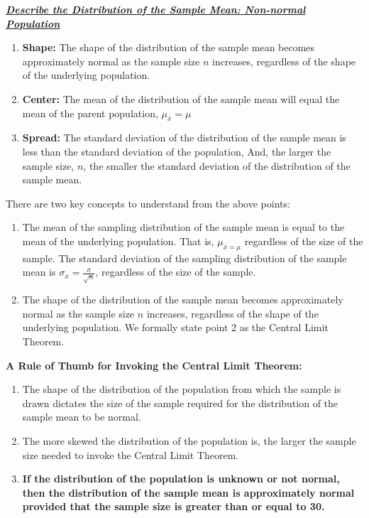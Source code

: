 \documentclass{report}
\begin{document}
     \pagebreak \bigbreak \noindent 
     \textbf{\textit{\underline{Describe the Distribution of the Sample Mean: Non-normal Population}}}
     \bigbreak \noindent 
     \begin{enumerate}
         \item \textbf{Shape:} The shape of the distribution of the sample mean becomes approximately normal as the sample size $n $ increases, regardless of the shape of the underlying population.
        \item \textbf{Center:} The mean of the distribution of the sample mean will equal the mean of the parent population, $\mu_{\overline{x}} = \mu$
        \item \textbf{Spread:} The standard deviation of the distribution of the sample mean is less than the standard deviation of the population, And, the larger the sample size, $n $, the smaller the standard deviation of the distribution of the sample mean.
     \end{enumerate}
     \bigbreak \noindent 
     There are two key concepts to understand from the above points:
     \begin{enumerate}
         \item The mean of the sampling distribution of the sample mean is equal to the mean of the underlying population. That is, $\mu_{\overline{x} = \mu} $ regardless of the size of the sample. The standard deviation of the sampling distribution of the sample mean is $\sigma_{\overline{x}} = \frac{\sigma}{\sqrt{n}} $, regardless of the size of the sample.
        \item The shape of the distribution of the sample mean becomes approximately normal as the sample size $n$ increases, regardless of the shape of the underlying population.
        \hspace{\parindent}  We formally state point 2 as the Central Limit Theorem.
     \end{enumerate}

     \bigbreak \noindent 
     \textbf{A Rule of Thumb for Invoking the Central Limit Theorem:}
     \bigbreak \noindent 
     \begin{enumerate}
         \item The shape of the distribution of the population from which the sample is drawn dictates the size of the sample required for the distribution of the sample mean to be normal.
         \item The more skewed the distribution of the population is, the larger the sample size needed to invoke the Central Limit Theorem.
        \item \textbf{If the distribution of the population is unknown or not normal, then the distribution of the sample mean is approximately normal provided that the sample size is greater than or equal to 30.}
     \end{enumerate}
\end{document}
